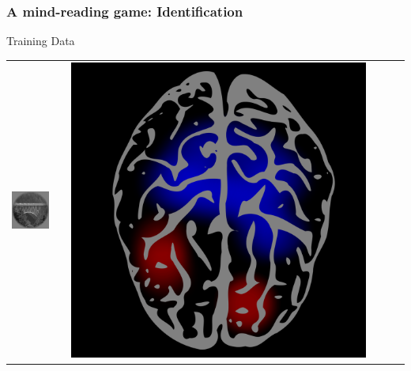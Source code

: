 \documentclass{beamer}
\begin{document}
\begin{frame}
\frametitle{A mind-reading game: Identification}
\begin{center}
Training Data
\\
\begin{tabular}{ccc||ccc}
\hline
\includegraphics[scale = .26]{img1.png} & \hspace{0.2in} & \includegraphics[scale = 0.035]{brain1.png} &

\end{tabular}
\end{center}
\end{frame}
\end{document}
